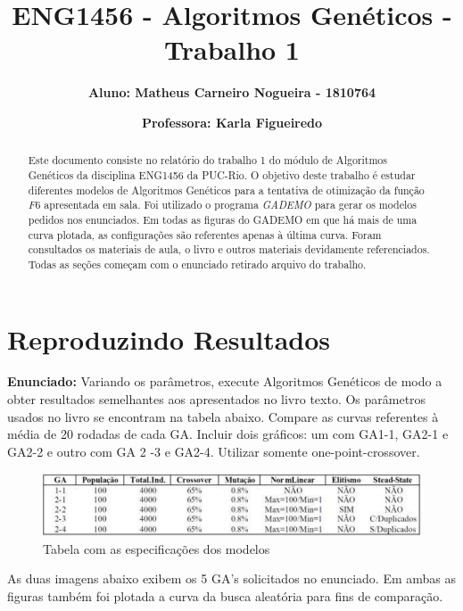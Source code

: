 \documentclass[12pt]{article}
\title{\textbf{ENG1456 - Algoritmos Genéticos - Trabalho 1}}
\author{\textbf{Aluno: Matheus Carneiro Nogueira - 1810764}}
\affil{}
\author{\textbf{Professora: Karla Figueiredo}}
\affil{}
\date{}
\begin{document}
	\maketitle
	\tableofcontents
	
	
	\begin{abstract}
		Este documento consiste no relatório do trabalho 1 do módulo de Algoritmos Genéticos da disciplina ENG1456 da PUC-Rio. O objetivo deste trabalho é estudar diferentes modelos de Algoritmos Genéticos para a tentativa de otimização da função $F6$ apresentada em sala. Foi utilizado o programa \textit{GADEMO} para gerar os modelos pedidos nos enunciados. Em todas as figuras do GADEMO em que há mais de uma curva plotada, as configurações são referentes apenas à última curva. Foram consultados os materiais de aula, o livro \cite{davis1991handbook} e outros materiais devidamente referenciados. Todas as seções começam com o enunciado retirado arquivo do trabalho.
	\end{abstract}
	
\section{Reproduzindo Resultados}

\textbf{Enunciado:}
Variando os parâmetros, execute Algoritmos Genéticos de modo a obter resultados semelhantes aos apresentados no livro texto. Os parâmetros usados no livro se encontram na tabela abaixo. Compare as curvas referentes à média de 20 rodadas de cada GA. Incluir dois gráficos: um com GA1-1, GA2-1 e GA2-2 e outro com GA 2 -3 e GA2-4. Utilizar somente one-point-crossover.

\begin{figure}[H]
	\centering
	\includegraphics[width=0.9\linewidth]{Imagens/tabela_especificacao_modelos}
	\caption{Tabela com as especificações dos modelos}
	\label{fig:tabelaespecificacaomodelos}
\end{figure}


As duas imagens abaixo exibem os 5 GA's solicitados no enunciado. Em ambas as figuras também foi plotada a curva da busca aleatória para fins de comparação.
\end{document}
